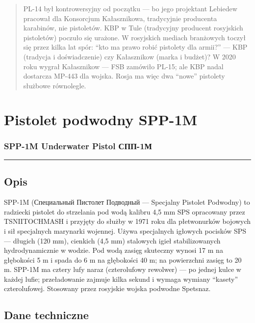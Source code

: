 \documentclass[12pt,openany,oneside]{book}
\begin{document}
\begin{quote}
PL-14 był kontrowersyjny od początku --- bo jego projektant Lebiedew
pracował dla Konsorcjum Kałasznikowa, tradycyjnie producenta karabinów,
nie pistoletów. KBP w Tule (tradycyjny producent rosyjskich pistoletów)
poczuło się urażone. W rosyjskich mediach branżowych toczył się przez
kilka lat spór: ``kto ma prawo robić pistolety dla armii?'' --- KBP
(tradycja i doświadczenie) czy Kałasznikow (marka i budżet)? W 2020 roku
wygrał Kałasznikow --- FSB zamówiło PL-15; ale KBP nadal dostarcza
MP-443 dla wojska. Rosja ma więc dwa ``nowe'' pistolety służbowe
równolegle.
\end{quote}

\chapter{Pistolet podwodny SPP-1M}\label{pistolet-podwodny-spp-1m}

\subsection{SPP-1M Underwater Pistol \textbar{}
СПП-1М}\label{spp-1m-underwater-pistol-ux441ux43fux43f-1ux43c}

\begin{center}\rule{0.5\linewidth}{0.5pt}\end{center}

\section{Opis}\label{opis-99}

SPP-1M (Специальный Пистолет Подводный --- Specjalny Pistolet Podwodny)
to radziecki pistolet do strzelania pod wodą kalibru 4,5 mm SPS
opracowany przez TSNIITOCHMASH i przyjęty do służby w 1971 roku dla
płetwonurków bojowych i sił specjalnych marynarki wojennej. Używa
specjalnych igłowych pocisków SPS --- długich (120 mm), cienkich (4,5
mm) stalowych igieł stabilizowanych hydrodynamicznie w wodzie. Pod wodą
zasięg skuteczny wynosi 17 m na głębokości 5 m i spada do 6 m na
głębokości 40 m; na powierzchni zasięg to 20 m. SPP-1M ma cztery lufy
naraz (czterolufowy rewolwer) --- po jednej kulce w każdej lufie;
przeładowanie zajmuje kilka sekund i wymaga wymiany ``kasety''
czterolufowej. Stosowany przez rosyjskie wojska podwodne Spetsnaz.

\section{Dane techniczne}\label{dane-techniczne-99}
\end{document}

